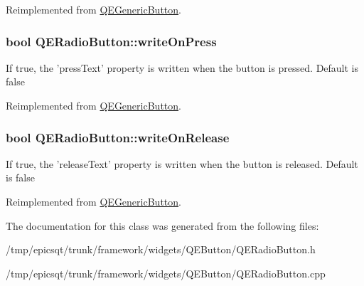 Reimplemented from \hyperlink{classQEGenericButton}{QEGenericButton}.

\hypertarget{classQERadioButton_abc935229d195497727f4c18a3fd589f0}{
\subsubsection[{writeOnPress}]{\setlength{\rightskip}{0pt plus 5cm}bool QERadioButton::writeOnPress}}
\label{classQERadioButton_abc935229d195497727f4c18a3fd589f0}
If true, the 'pressText' property is written when the button is pressed. Default is false 

Reimplemented from \hyperlink{classQEGenericButton}{QEGenericButton}.

\hypertarget{classQERadioButton_a5b414910f53e8d584e1ccbdb3c813b26}{
\subsubsection[{writeOnRelease}]{\setlength{\rightskip}{0pt plus 5cm}bool QERadioButton::writeOnRelease}}
\label{classQERadioButton_a5b414910f53e8d584e1ccbdb3c813b26}
If true, the 'releaseText' property is written when the button is released. Default is false 

Reimplemented from \hyperlink{classQEGenericButton}{QEGenericButton}.



The documentation for this class was generated from the following files:\begin{DoxyCompactItemize}
\item 
/tmp/epicsqt/trunk/framework/widgets/QEButton/QERadioButton.h\item 
/tmp/epicsqt/trunk/framework/widgets/QEButton/QERadioButton.cpp\end{DoxyCompactItemize}
